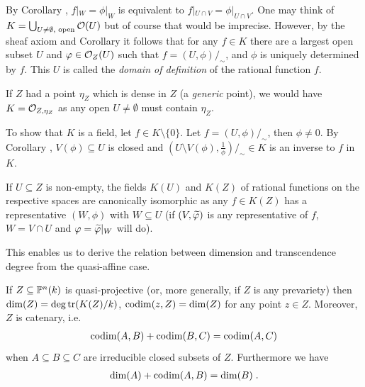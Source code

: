 \documentclass[a4paper,parskip=half,numbers=enddot, DIV=12]{scrreprt}
\begin{document}
\begin{rem*}
    \begin{alphanumerate}
        \item 
            By Corollary , $f|_W = \phi|_W$ is equivalent to $f|_{U\cap V} = \phi|_{U\cap V}$. One may think of $K=\bigcup_{U\neq\emptyset,\text{ open}} \mathcal{O}(U)$ but of course that would be imprecise. However, by the sheaf axiom and Corollary  it follows that for any $f\in K$ there are a largest open subset $U$ and $\varphi \in \mathcal{O}_Z(U)$ such that $f=(U,\phi)/_\sim$, and $\phi$ is uniquely determined by $f$. This $U$ is called the \emph{domain of definition} of the rational function $f$.
        \item 
            If $Z$ had a point $\eta_Z$ which is dense in $Z$ (a \emph{generic} point), we would have $K = \mathcal{O}_{Z,\eta_Z}$ as any open $U\neq \emptyset$ must contain $\eta_Z$.
        \item
            To show that $K$ is a field, let $f\in K\setminus \{0\}$. Let $f=(U,\phi)/_\sim$, then $\phi\neq 0$. By Corollary , $V(\phi)\subseteq U$ is closed and $\left(U\setminus V(\phi), \frac{1}{\phi}\right)/_\sim \in K$ is an inverse to $f$ in $K$.
        \item 
            If $U\subseteq Z$ is non-empty, the fields $K(U)$ and $K(Z)$ of rational functions on the respective spaces are canonically isomorphic as any $f\in K(Z)$ has a representative $(W,\phi)$ with $W\subseteq U$ (if $(V,\snake\phi)$ is any representative of $f$, $W=V\cap U$ and $\phi=\snake \phi|_W$ will do).
    \end{alphanumerate}
\end{rem*}
This enables us to derive the relation between dimension and transcendence degree from the quasi-affine case.
\begin{prop}
    If $Z\subseteq \mathbb{P}^n(k)$ is quasi-projective (or, more generally, if $Z$ is any prevariety) then $\dim(Z) = \deg\operatorname{tr}(K(Z)/k)$, $\operatorname{codim}(z,Z) = \dim(Z)$ for any point $z\in Z$. Moreover, $Z$ is catenary, i.e.
    \begin{align*}
        \operatorname{codim}(A,B) +\operatorname{codim}(B,C) = \operatorname{codim}(A,C)
    \end{align*}
    when $A\subseteq B\subseteq C$ are irreducible closed subsets of $Z$. Furthermore we have
    \begin{align*}
        \dim(A) +\operatorname{codim}(A,B) = \dim(B)\;.
    \end{align*}
\end{prop}
\end{document}
